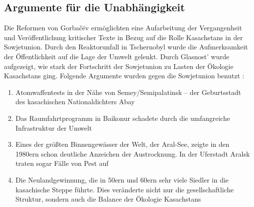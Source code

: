 \documentclass[12pt,headsepline,a4paper]{scrartcl}
\begin{document}
\subsection{Argumente für die Unabhängigkeit}
Die Reformen von Gorbačëv ermöglichten eine Aufarbeitung der Vergangenheit und
Veröffentlichung kritischer Texte in Bezug auf die Rolle Kasachstans in der
Sowjetunion. Durch den Reaktorunfall in Tschernobyl wurde die Aufmerksamkeit der
Öffentlichkeit auf die Lage der Umwelt gelenkt. Durch Glasnost'
wurde aufgezeigt, wie stark der Fortschritt der Sowjetunion zu Lasten der Ökologie
Kasachstans ging. Folgende Argumente wurden gegen die Sowjetunion benutzt \autocite[60]{trut1994}:
\begin{enumerate}
 \item Atomwaffentests in der Nähe von Semey/Semipalatinsk – der Geburtsstadt des
kasachischen Nationaldichters Abay
\item Das Raumfahrtprogramm in Baikonur schadete durch die umfangreiche
Infrastruktur der Umwelt
\item Eines der größten Binnengewässer der Welt, der Aral-See, zeigte in den 1980ern
schon deutliche Anzeichen der Austrocknung. In der Uferstadt Aralsk traten sogar Fälle
von Pest auf
\item Die Neulandgewinnung, die in 50ern und 60ern sehr viele Siedler in die
kasachische Steppe führte. Dies veränderte nicht nur die gesellschaftliche Struktur,
sondern auch die Balance der Ökologie Kasachstans 
\end{enumerate}
\end{document}
